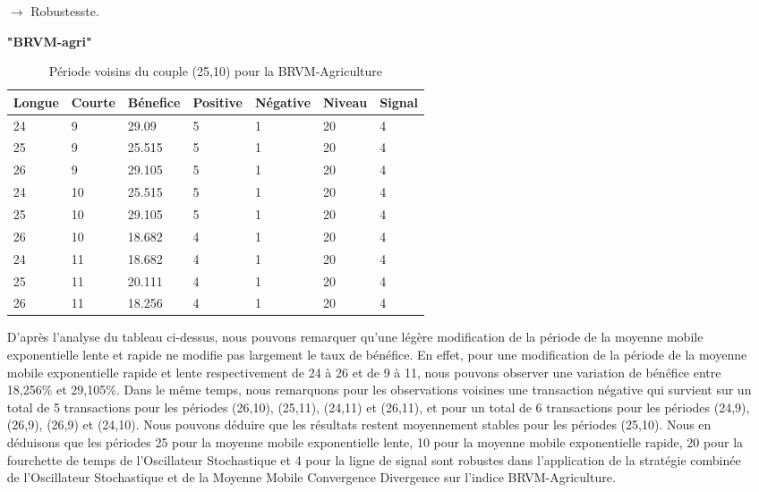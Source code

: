 \begin{itemize}
\item[$\rightarrow$] Robustesste.
    \begin{center}
        \textbf{"BRVM-agri" }
    \end{center}
    \begin{table}[ht]
        \centering
        \caption{Période voisins du couple (25,10) pour la BRVM-Agriculture}
        \begin{tabular}{p{1.5cm}p{1.5cm}p{1.5cm}p{1.5cm}p{1.5cm}p{1.5cm}p{1.5cm}}
            \hline
            Longue & Courte & Bénefice & Positive &Négative &Niveau &Signal\\
            \hline
            24	&9	&29.09	&5	&1	&20	&4	\\  
            25	&9	&25.515	&5	&1	&20	&4	\\  
            26	&9	&29.105	&5	&1	&20	&4	\\  
            24	&10	&25.515	&5	&1	&20	&4	\\  \hline
            \cellcolor{myblue}25	&\cellcolor{myblue}10	&\cellcolor{myblue}29.105	
            &\cellcolor{myblue}5	&\cellcolor{myblue}1	&\cellcolor{myblue}20	&\cellcolor{myblue}4 \\ \hline  
            26	&10	&18.682	&4	&1	&20	&4	\\  
            24	&11	&18.682	&4	&1	&20	&4	\\  
            25	&11	&20.111	&4	&1	&20	&4	\\  
            26	&11	&18.256	&4	&1	&20	&4	\\ 
            \hline
        \end{tabular}
    \end{table}%

    \par{D'après l'analyse du tableau ci-dessus, nous pouvons remarquer qu'une légère modification de la 
    période de la moyenne mobile exponentielle lente et rapide ne modifie pas largement le taux de 
    bénéfice. En effet, pour une modification de la période de la moyenne mobile exponentielle rapide 
    et lente respectivement de 24 à 26 et de 9 à 11, nous pouvons observer une variation de bénéfice
    entre 18,256\% et 29,105\%. Dans le même temps, nous remarquons pour les observations voisines une transaction 
    négative qui survient sur un total de 5 transactions pour les périodes (26,10), (25,11), (24,11) et 
    (26,11), et pour un total de 6 transactions pour les périodes (24,9), (26,9), (26,9) et (24,10). 
    Nous pouvons déduire que les résultats restent moyennement stables pour les périodes (25,10). Nous en 
    déduisons que les périodes 25 pour la moyenne mobile exponentielle lente, 10 pour la moyenne 
    mobile exponentielle rapide, 20 pour la fourchette de temps de l'Oscillateur Stochastique et 
    4 pour la ligne de signal sont robustes dans l'application de la stratégie combinée de l'Oscillateur Stochastique et 
    de la Moyenne Mobile Convergence Divergence sur l'indice BRVM-Agriculture.}
    

\end{itemize}
